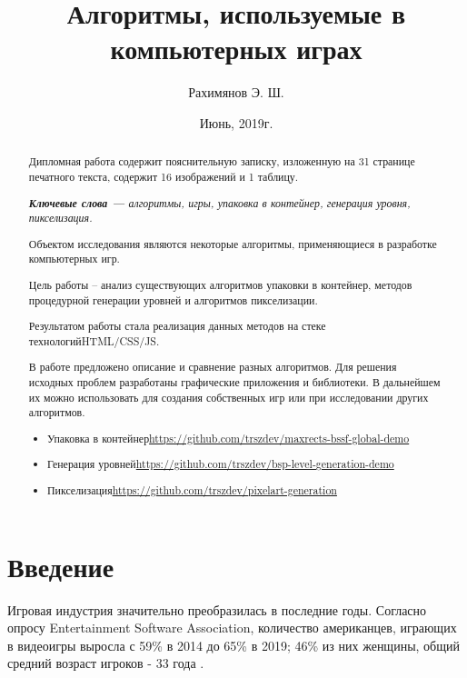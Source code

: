 \documentclass[a4paper,12pt]{report}
\title{Алгоритмы, используемые в компьютерных играх}
\author{Рахимянов Э. Ш.}
\date{Июнь, 2019г.}
\theoremstyle{remark}
\begin{document}
\maketitle

\begin{abstract}
Дипломная работа содержит пояснительную записку,
изложенную на 31 странице печатного текста, содержит 16 изображений и 1 таблицу.

\textit{\textbf{Ключевые слова --- }алгоритмы, игры, упаковка в контейнер, генерация уровня, пикселизация.}

Объектом исследования являются некоторые алгоритмы, применяющиеся в разработке компьютерных игр.

Цель работы – анализ существующих алгоритмов упаковки в контейнер, методов процедурной генерации уровней и алгоритмов пикселизации.

Результатом работы стала реализация данных методов на стеке технологий\newline HTML/CSS/JS.

В работе предложено описание и сравнение разных алгоритмов. Для решения исходных проблем разработаны графические приложения и библиотеки. В дальнейшем их можно использовать для создания собственных игр или при исследовании других алгоритмов.
\begin{itemize}
  \item  Упаковка в контейнер\newline\url{https://github.com/trszdev/maxrects-bssf-global-demo}
  \item  Генерация уровней\newline\url{https://github.com/trszdev/bsp-level-generation-demo}
  \item  Пикселизация\newline\url{https://github.com/trszdev/pixelart-generation}
\end{itemize}
\end{abstract}

\tableofcontents

\chapter{Введение}

\parindent=1cm
Игровая индустрия значительно преобразилась в последние годы. Согласно опросу Entertainment Software Association, количество американцев, играющих в видеоигры выросла с 59\% в 2014 до 65\% в 2019; 46\% из них женщины, общий средний возраст игроков - 33 года \citep{esa_old}\citep{esa}.
\end{document}
